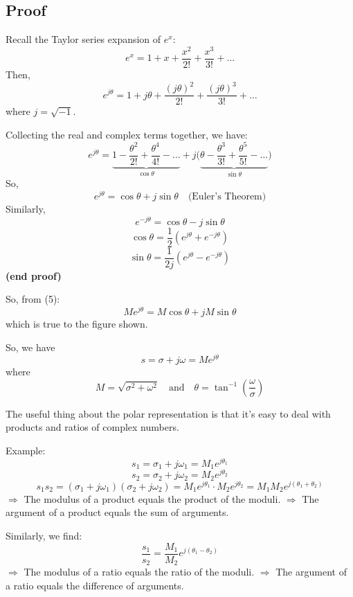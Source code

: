 \documentclass{book}
\newcommand{\jw}{j\omega}
\begin{document}
	\subsection*{Proof}
	Recall the Taylor series expansion of $ e^x $:
	\[ e^x = 1+ x+ \frac{x^2}{2!}+\frac{x^3}{3!}+\ldots \]
	Then,
	\[ e^{j\theta} = 1+ {j\theta}+ \frac{({j\theta})^2}{2!}+\frac{({j\theta})^3}{3!}+\ldots \]
	where $ j=\sqrt{-1} $.
	
	Collecting the real and complex terms together, we have:
	\[ e^{j\theta} = \underbrace{1-\frac{\theta^2}{2!}+\frac{\theta^4}{4!}-\ldots}_{\cos\theta} + j\Big(\underbrace{\theta-\frac{\theta^3}{3!}+\frac{\theta^5}{5!}-\ldots}_{\sin\theta}\Big) \]
	So,
	\[
	e^{j\theta}=\cos\theta+j\sin\theta \quad\textrm{(Euler's Theorem)}
	\]
	Similarly,
	\[e^{-j\theta}=\cos\theta-j\sin\theta\]
	\[ \cos\theta=\frac{1}{2}\left(e^{j\theta}+e^{-j\theta}\right) \]
	\[ \sin\theta=\frac{1}{2j}\left(e^{j\theta}-e^{-j\theta}\right) \]
	\textbf{(end proof)}
	
	So, from (5):
	\begin{equation}
	Me^{j\theta} = M\cos\theta+jM\sin\theta
	\end{equation}
	which is true to the figure shown.
	
	So, we have
	\[ s = \sigma + \jw = Me^{j\theta} \]
	where
	\[ M=\sqrt{\sigma^2+\omega^2}\quad\textrm{and}\quad\theta=\tan^{-1}\left(\frac{\omega}{\sigma}\right) \]
	
	The useful thing about the polar representation is that it's easy to deal with products and ratios of complex numbers.
	
	Example:
	\[ s_1 = \sigma_1 + \jw_1 = M_1e^{j\theta_1} \]
	\[ s_2 = \sigma_2 + \jw_2 = M_2e^{j\theta_2} \]
	\[ s_1s_2 = (\sigma_1 + \jw_1)(\sigma_2 + \jw_2) = M_1e^{j\theta_1}\cdot M_2e^{j\theta_2} = M_1M_2e^{j(\theta_1+\theta_2)} \]
	$ \Longrightarrow $ The modulus of a product equals the product of the moduli.
	$ \Longrightarrow $ The argument of a product equals the sum of arguments.
	
	Similarly, we find:
	\[ \frac{s_1}{s_2} = \frac{M_1}{M_2}e^{j(\theta_1-\theta_2)} \]
	$ \Longrightarrow $ The modulus of a ratio equals the ratio of the moduli.
	$ \Longrightarrow $ The argument of a ratio equals the difference of arguments.
	
\end{document}

